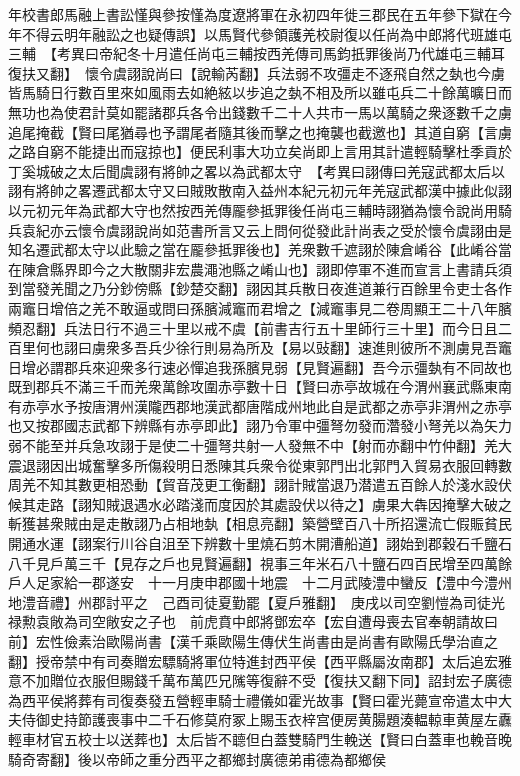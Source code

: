 年校書郎馬融上書訟慬與參按慬為度遼將軍在永初四年徙三郡民在五年參下獄在今年不得云明年融訟之也疑傳誤】以馬賢代參領護羌校尉復以任尚為中郎將代班雄屯三輔　【考異曰帝紀冬十月遣任尚屯三輔按西羌傳司馬鈞扺罪後尚乃代雄屯三輔耳復扶又翻】　懷令虞詡說尚曰【說輸芮翻】兵法弱不攻彊走不逐飛自然之埶也今虜皆馬騎日行數百里來如風雨去如絶絃以步追之埶不相及所以雖屯兵二十餘萬曠日而無功也為使君計莫如罷諸郡兵各令出錢數千二十人共市一馬以萬騎之衆逐數千之虜追尾掩截【賢曰尾猶尋也予謂尾者隨其後而擊之也掩襲也截邀也】其道自窮【言虜之路自窮不能捷出而寇掠也】便民利事大功立矣尚即上言用其計遣輕騎擊杜季貢於丁奚城破之太后聞虞詡有將帥之畧以為武都太守　【考異曰詡傳曰羌寇武都太后以詡有將帥之畧遷武都太守又曰賊敗散南入益州本紀元初元年羌寇武都漢中據此似詡以元初元年為武都大守也然按西羌傳龎參抵罪後任尚屯三輔時詡猶為懷令說尚用騎兵袁紀亦云懷令虞詡說尚如范書所言又云上問何從發此計尚表之受於懷令虞詡由是知名遷武都太守以此驗之當在龎參抵罪後也】羌衆數千遮詡於陳倉崤谷【此崤谷當在陳倉縣界即今之大散關非宏農澠池縣之崤山也】詡即停軍不進而宣言上書請兵須到當發羌聞之乃分鈔傍縣【鈔楚交翻】詡因其兵散日夜進道兼行百餘里令吏士各作兩竈日增倍之羌不敢逼或問曰孫臏減竈而君增之【減竈事見二卷周顯王二十八年臏頻忍翻】兵法日行不過三十里以戒不虞【前書吉行五十里師行三十里】而今日且二百里何也詡曰虜衆多吾兵少徐行則易為所及【易以䜴翻】速進則彼所不測虜見吾竈日增必謂郡兵來迎衆多行速必憚追我孫臏見弱【見賢遍翻】吾今示彊埶有不同故也既到郡兵不滿三千而羌衆萬餘攻圍赤亭數十日【賢曰赤亭故城在今渭州襄武縣東南有赤亭水予按唐渭州漢隴西郡地漢武都唐階成州地此自是武都之赤亭非渭州之赤亭也又按郡國志武都下辨縣有赤亭即此】詡乃令軍中彊弩勿發而濳發小弩羌以為矢力弱不能至并兵急攻詡于是使二十彊弩共射一人發無不中【射而亦翻中竹仲翻】羌大震退詡因出城奮擊多所傷殺明日悉陳其兵衆令從東郭門出北郭門入貿易衣服回轉數周羌不知其數更相恐動【貿音茂更工衡翻】詡計賊當退乃潜遣五百餘人於淺水設伏候其走路【詡知賊退遇水必踏淺而度因於其處設伏以待之】虜果大犇因掩擊大破之斬獲甚衆賊由是走散詡乃占相地埶【相息亮翻】築營壁百八十所招還流亡假賑貧民開通水運【詡案行川谷自沮至下辨數十里燒石剪木開漕船道】詡始到郡穀石千鹽石八千見戶萬三千【見存之戶也見賢遍翻】視事三年米石八十鹽石四百民增至四萬餘戶人足家給一郡遂安　十一月庚申郡國十地震　十二月武陵澧中蠻反【澧中今澧州地澧音禮】州郡討平之　己酉司徒夏勤罷【夏戶雅翻】　庚戌以司空劉愷為司徒光禄勲袁敞為司空敞安之子也　前虎賁中郎將鄧宏卒【宏自遭母喪去官奉朝請故曰前】宏性儉素治歐陽尚書【漢千乘歐陽生傳伏生尚書由是尚書有歐陽氏學治直之翻】授帝禁中有司奏贈宏驃騎將軍位特進封西平侯【西平縣屬汝南郡】太后追宏雅意不加贈位衣服但賜錢千萬布萬匹兄隲等復辭不受【復扶又翻下同】詔封宏子廣德為西平侯將葬有司復奏發五營輕車騎士禮儀如霍光故事【賢曰霍光薨宣帝遣太中大夫侍御史持節護喪事中二千石修莫府冢上賜玉衣梓宫便房黄腸題湊輼輬車黄屋左纛輕車材官五校士以送葬也】太后皆不聼但白蓋雙騎門生輓送【賢曰白蓋車也輓音晚騎奇寄翻】後以帝師之重分西平之都鄉封廣德弟甫德為都鄉侯

